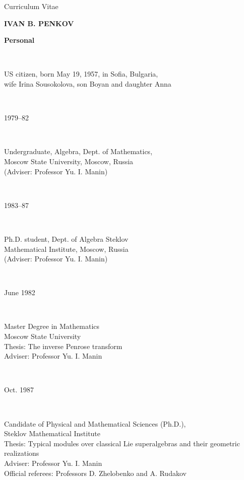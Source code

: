 \documentclass[11pt]{amsart}
\newcommand{\thc}[2]{\noindent\parbox[t]{40mm}{#1}\
\parbox[t]{105mm}{#2}\\
}
\begin{document}
\begin{center}
Curriculum Vitae

\medskip

{\large{\bf IVAN B. PENKOV}}
\end{center}

\bigskip

\thc{\bf Personal}{US citizen, born May 19, 1957, in Sofia,
Bulgaria,\\ wife Irina Sousokolova, son Boyan and daughter Anna}

\medskip


\medskip

\thc{1979--82}{Undergraduate, Algebra, Dept. of Mathematics,\\
Moscow State University, Moscow, Russia\\
(Adviser: Professor Yu. I. Manin)\\}
\thc{1983--87}{Ph.D. student, Dept. of Algebra
Steklov \\Mathematical Institute, Moscow, Russia\\
(Adviser: Professor Yu. I. Manin)}

\bigskip


\medskip

\thc{June 1982}{Master Degree in Mathematics\\
Moscow State University \\ Thesis:  The inverse Penrose
transform\\
Adviser:  Professor Yu. I. Manin\\}
\thc{Oct. 1987}{Candidate of Physical and Mathematical Sciences (Ph.D.),\\
Steklov Mathematical Institute\\
Thesis:  Typical modules over classical Lie superalgebras and their
geometric realizations\\
Adviser:  Professor Yu. I. Manin\\
Official referees:  Professors D. Zhelobenko and A. Rudakov}

\bigskip


\medskip
\end{document}
